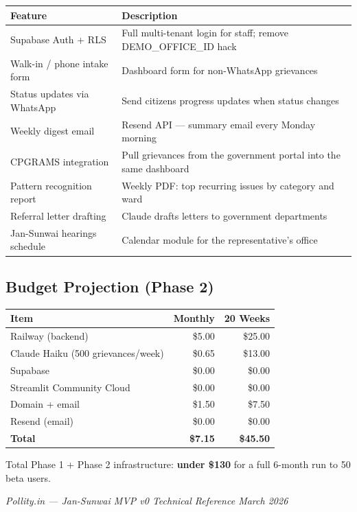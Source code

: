 \documentclass[11pt, a4paper]{article}
\begin{document}
\begin{tabularx}{\linewidth}{lX}
\toprule
\textbf{Feature} & \textbf{Description} \\
\midrule
Supabase Auth + RLS         & Full multi-tenant login for staff; remove DEMO\_OFFICE\_ID hack \\
Walk-in / phone intake form & Dashboard form for non-WhatsApp grievances \\
Status updates via WhatsApp & Send citizens progress updates when status changes \\
Weekly digest email         & Resend API — summary email every Monday morning \\
CPGRAMS integration         & Pull grievances from the government portal into the same dashboard \\
Pattern recognition report  & Weekly PDF: top recurring issues by category and ward \\
Referral letter drafting    & Claude drafts letters to government departments \\
Jan-Sunwai hearings schedule & Calendar module for the representative's office \\
\bottomrule
\end{tabularx}

\subsection{Budget Projection (Phase 2)}

\begin{tabularx}{\linewidth}{lrr}
\toprule
\textbf{Item} & \textbf{Monthly} & \textbf{20 Weeks} \\
\midrule
Railway (backend)          & \$5.00  & \$25.00 \\
Claude Haiku (500 grievances/week) & \$0.65  & \$13.00 \\
Supabase                   & \$0.00  & \$0.00 \\
Streamlit Community Cloud  & \$0.00  & \$0.00 \\
Domain + email             & \$1.50  & \$7.50 \\
Resend (email)             & \$0.00  & \$0.00 \\
\midrule
\textbf{Total}             & \textbf{\$7.15} & \textbf{\$45.50} \\
\bottomrule
\end{tabularx}

\vspace{1em}
Total Phase 1 + Phase 2 infrastructure: \textbf{under \$130} for a full 6-month run to 50 beta users.

\vfill
\begin{center}
{\color{gray}\small\textit{Pollity.in — Jan-Sunwai MVP v0 Technical Reference \textbar{} March 2026}}
\end{center}
\end{document}

